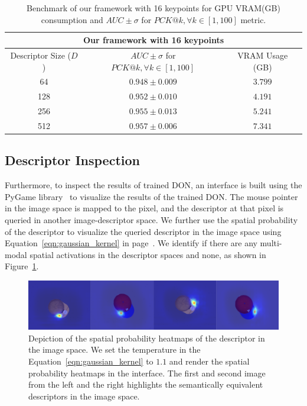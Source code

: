\begin{table}[htb]
    \caption{Benchmark of our framework with 16 keypoints for GPU VRAM(GB) consumption and $AUC \pm \sigma$ for $PCK@k,  \forall k \in [1, 100]$ metric.}
    \label{table:reduced_framework_training_results}
    \centering
    \begin{tabular}{ccc}
        \toprule
        \multicolumn{3}{c}{Our framework with 16 keypoints}                                            \\
        \midrule
        Descriptor Size ($D$) & $AUC \pm \sigma$ for $PCK@k, \forall k \in [1, 100]$ & VRAM Usage (GB) \\ \hline
        64                    & $0.948 \pm 0.009$                                    & $3.799 $        \\
        128                   & $0.952 \pm 0.010$                                    & $4.191 $        \\
        256                   & $0.955 \pm 0.013$                                    & $5.241 $        \\
        512                   & $0.957 \pm 0.006$                                    & $7.341 $        \\
        \bottomrule
    \end{tabular}
\end{table}

\subsection{Descriptor Inspection}
Furthermore, to inspect the
results of trained DON, an interface is built using the PyGame library~\cite{pygame} to visualize the results of the trained DON.
The mouse pointer in the image space is mapped to the pixel, and the descriptor at that pixel is queried in another image-descriptor space.
We further use the spatial probability of the descriptor to visualize the queried descriptor
in the image space using Equation~\ref{eqn:gaussian_kernel} in page~\pageref{eqn:gaussian_kernel}.
We identify if there are any multi-modal spatial activations in the descriptor spaces and none, as shown in Figure~\ref{fig:check_don}.

\begin{figure}[htb]
    \centering
    \includegraphics[scale=0.3]{images/test_don.png}
    \caption{Depiction of the spatial probability heatmaps of the descriptor in the image space. We set the temperature in the Equation~\ref{eqn:gaussian_kernel} to $1.1$
        and render the spatial probability heatmaps in the interface. The first and second image from the left and the right highlights the semantically equivalent descriptors in the image space.}
    \label{fig:check_don}
\end{figure}

